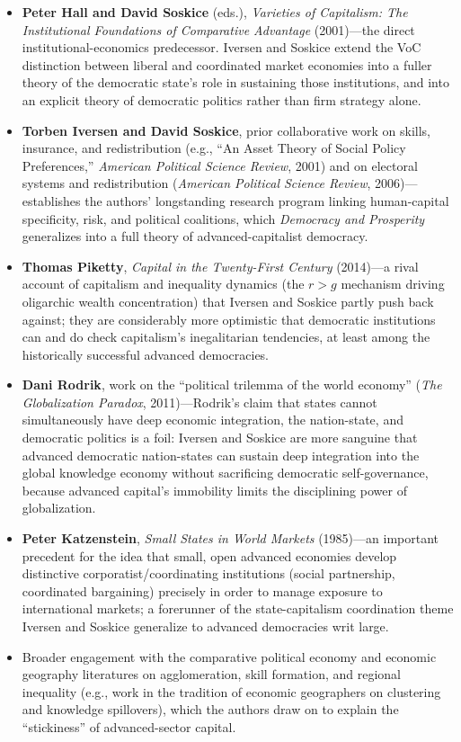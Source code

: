 \documentclass[12pt]{article}
\begin{document}
\begin{itemize}[leftmargin=*, itemsep=4pt]
    \item \textbf{Peter Hall and David Soskice} (eds.), \textit{Varieties of Capitalism: The Institutional Foundations of Comparative Advantage} (2001)---the direct institutional-economics predecessor. Iversen and Soskice extend the VoC distinction between liberal and coordinated market economies into a fuller theory of the democratic state's role in sustaining those institutions, and into an explicit theory of democratic politics rather than firm strategy alone.
    \item \textbf{Torben Iversen and David Soskice}, prior collaborative work on skills, insurance, and redistribution (e.g., ``An Asset Theory of Social Policy Preferences,'' \textit{American Political Science Review}, 2001) and on electoral systems and redistribution (\textit{American Political Science Review}, 2006)---establishes the authors' longstanding research program linking human-capital specificity, risk, and political coalitions, which \textit{Democracy and Prosperity} generalizes into a full theory of advanced-capitalist democracy.
    \item \textbf{Thomas Piketty}, \textit{Capital in the Twenty-First Century} (2014)---a rival account of capitalism and inequality dynamics (the $r > g$ mechanism driving oligarchic wealth concentration) that Iversen and Soskice partly push back against; they are considerably more optimistic that democratic institutions can and do check capitalism's inegalitarian tendencies, at least among the historically successful advanced democracies.
    \item \textbf{Dani Rodrik}, work on the ``political trilemma of the world economy'' (\textit{The Globalization Paradox}, 2011)---Rodrik's claim that states cannot simultaneously have deep economic integration, the nation-state, and democratic politics is a foil: Iversen and Soskice are more sanguine that advanced democratic nation-states can sustain deep integration into the global knowledge economy without sacrificing democratic self-governance, because advanced capital's immobility limits the disciplining power of globalization.
    \item \textbf{Peter Katzenstein}, \textit{Small States in World Markets} (1985)---an important precedent for the idea that small, open advanced economies develop distinctive corporatist/coordinating institutions (social partnership, coordinated bargaining) precisely in order to manage exposure to international markets; a forerunner of the state-capitalism coordination theme Iversen and Soskice generalize to advanced democracies writ large.
    \item Broader engagement with the comparative political economy and economic geography literatures on agglomeration, skill formation, and regional inequality (e.g., work in the tradition of economic geographers on clustering and knowledge spillovers), which the authors draw on to explain the ``stickiness'' of advanced-sector capital.
\end{itemize}
\end{document}
